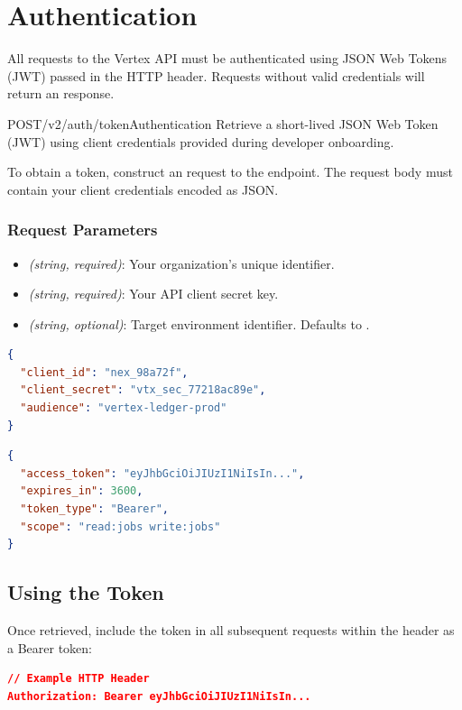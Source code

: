 \section{Authentication}
\label{sec:authentication}
All requests to the Vertex API must be authenticated using JSON Web Tokens (JWT) \cite{rfc7519} passed in the  HTTP header. Requests without valid credentials will return an  response.

\begin{apiendpoint}{POST}{/v2/auth/token}{Authentication}
Retrieve a short-lived JSON Web Token (JWT) using client credentials provided during developer onboarding.
\end{apiendpoint}

\noindent
To obtain a token, construct an  request to the  endpoint. The request body must contain your client credentials encoded as JSON.

\subsubsection{Request Parameters}
\begin{itemize}
  \item {} \textit{(string, required)}: Your organization's unique identifier.
  \item {} \textit{(string, required)}: Your API client secret key.
  \item {} \textit{(string, optional)}: Target environment identifier. Defaults to .
\end{itemize}

\noindent
\begin{minipage}[t]{0.48\linewidth}
  \begin{tcolorbox}[codeboxstyle, title={Example Request (JSON)}]
\begin{lstlisting}[language=json]
{
  "client_id": "nex_98a72f",
  "client_secret": "vtx_sec_77218ac89e",
  "audience": "vertex-ledger-prod"
}
\end{lstlisting}
  \end{tcolorbox}
\end{minipage}
\hfill
\begin{minipage}[t]{0.48\linewidth}
  \begin{tcolorbox}[codeboxstyle, title={Example Response (200 OK)}]
\begin{lstlisting}[language=json]
{
  "access_token": "eyJhbGciOiJIUzI1NiIsIn...",
  "expires_in": 3600,
  "token_type": "Bearer",
  "scope": "read:jobs write:jobs"
}
\end{lstlisting}
  \end{tcolorbox}
\end{minipage}

\subsection{Using the Token}
Once retrieved, include the token in all subsequent requests within the  header as a Bearer token:
\begin{lstlisting}[language=json,numbers=none]
// Example HTTP Header
Authorization: Bearer eyJhbGciOiJIUzI1NiIsIn...
\end{lstlisting}
